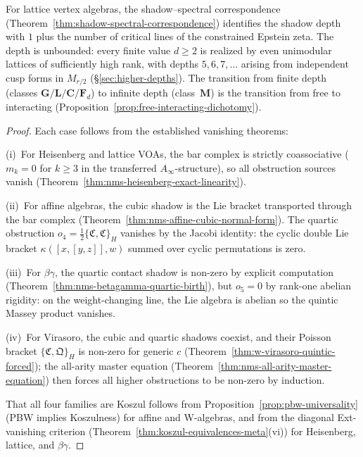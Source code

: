 \begin{theorem}
For lattice vertex algebras, the shadow--spectral correspondence
\textup{(}Theorem~\textup{\ref{thm:shadow-spectral-correspondence}})
identifies the shadow depth with $1$ plus the number of critical
lines of the constrained Epstein zeta.  The depth is unbounded:
every finite value $d \geq 2$ is realized by even unimodular
lattices of sufficiently high rank, with depths $5, 6, 7, \dotsc$
arising from independent cusp forms in $M_{r/2}$
\textup{(}\S\textup{\ref{sec:higher-depths})}.  The transition from
finite depth \textup{(}classes
$\mathbf{G}/\mathbf{L}/\mathbf{C}/\mathbf{F}_d$\textup{)} to
infinite depth \textup{(}class~$\mathbf{M}$\textup{)} is the
transition from free to interacting
\textup{(}Proposition~\textup{\ref{prop:free-interacting-dichotomy})}.
\end{theorem}

\begin{proof}
Each case follows from the established vanishing theorems:

(i)~For Heisenberg and lattice VOAs, the bar complex is strictly
coassociative ($m_k = 0$ for $k \geq 3$ in the transferred
$A_\infty$-structure), so all obstruction sources vanish
(Theorem~\ref{thm:nms-heisenberg-exact-linearity}).

(ii)~For affine algebras, the cubic shadow is the Lie bracket
transported through the bar complex
(Theorem~\ref{thm:nms-affine-cubic-normal-form}).  The quartic
obstruction $o_4 = \tfrac{1}{2}\{\mathfrak{C},\mathfrak{C}\}_H$
vanishes by the Jacobi identity: the cyclic double Lie bracket
$\kappa([x,[y,z]],w)$ summed over cyclic permutations is zero.

(iii)~For $\beta\gamma$, the quartic contact shadow is non-zero by
explicit computation
(Theorem~\ref{thm:nms-betagamma-quartic-birth}), but $o_5 = 0$ by
rank-one abelian rigidity: on the weight-changing line, the Lie
algebra is abelian so the quintic Massey product vanishes.

(iv)~For Virasoro, the cubic and quartic shadows coexist, and their
Poisson bracket $\{\mathfrak{C}, \mathfrak{Q}\}_H$ is non-zero for
generic $c$
(Theorem~\ref{thm:w-virasoro-quintic-forced}); the all-arity master
equation (Theorem~\ref{thm:nms-all-arity-master-equation}) then
forces all higher obstructions to be non-zero by induction.

That all four families are Koszul follows from
Proposition~\ref{prop:pbw-universality} (PBW implies Koszulness)
for affine and W-algebras, and from the diagonal
Ext-vanishing criterion
(Theorem~\ref{thm:koszul-equivalences-meta}(vi)) for
Heisenberg, lattice, and $\beta\gamma$.
\end{proof}

